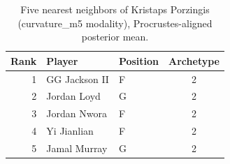 \begin{table}[htbp]
  \centering\small
  \begin{tabular}{rllc}
    \toprule
    Rank & Player & Position & Archetype \\
    \midrule
    1 & GG Jackson II & F & 2 \\
    2 & Jordan Loyd & G & 2 \\
    3 & Jordan Nwora & F & 2 \\
    4 & Yi Jianlian & F & 2 \\
    5 & Jamal Murray & G & 2 \\
    \bottomrule
  \end{tabular}
  \caption{Five nearest neighbors of Kristaps Porzingis (curvature_m5 modality), Procrustes-aligned posterior mean.}
  \label{tab:Kristaps_Porzingis_neighbors_curvature_m5}
\end{table}

